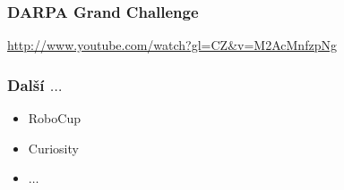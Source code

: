 \documentclass[red,handout,professionalfont]{beamer}
\theoremstyle{definition}
\newcommand{\0}{\mbox{${\bf 0}$}}
\renewcommand{\emph}[1]{{\bf #1}}
\begin{document}
\begin{frame}\frametitle{DARPA Grand Challenge}
\begin{center}
\url{http://www.youtube.com/watch?gl=CZ&v=M2AcMnfzpNg} 
\end{center}
\end{frame}


\begin{frame}\frametitle{Další $\ldots$}
\begin{itemize}
 \item RoboCup\pause{}
 \item Curiosity\pause{}
 \item $\ldots$
\end{itemize}
\end{frame}







% 
% 
% 
% 
% 
% 
% 
\end{document}
